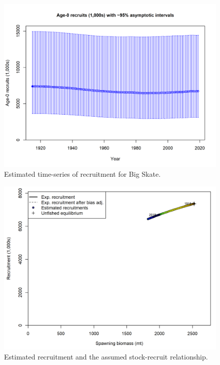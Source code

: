 \documentclass[12pt,]{article}
\begin{document}
\begin{figure}
\centering
\includegraphics{r4ss/plots_mod1/ts11_Age-0_recruits_(1000s)_with_95_asymptotic_intervals.png}
\caption{Estimated time-series of recruitment for Big Skate.
\label{fig:ts11_Age-0_recruits_(1000s)_with_95_asymptotic_intervals}}
\end{figure}

\begin{figure}
\centering
\includegraphics{r4ss/plots_mod1/SR_curve2.png}
\caption{Estimated recruitment and the assumed stock-recruit
relationship. \label{fig:SR_curve2}}
\end{figure}
\end{document}
